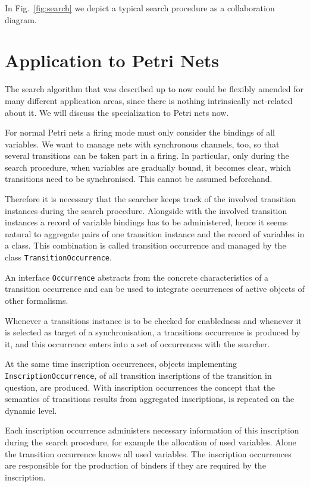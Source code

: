 
In Fig.~\ref{fig:search} we depict a typical search procedure as a 
collaboration diagram.


\section{Application to Petri Nets}
\label{sec:occrea}

The search algorithm that was described up to now could be flexibly
amended for many different application areas, since there is nothing
intrinsically net-related about it. We will discuss
the specialization to Petri nets now.

For normal Petri nets a firing mode must only consider the 
bindings of all variables. We want to manage nets with synchronous 
channels, too, so that several transitions can be taken part in a 
firing. In particular, only during the search procedure, when 
variables are gradually bound, it becomes 
clear, which transitions need to be synchronised.
This cannot be assumed beforehand.

Therefore it is necessary that the searcher keeps track 
of the involved transition instances during the search procedure. 
Alongside with the involved transition instances a record of variable 
bindings has to be administered, hence it seems natural to 
aggregate pairs of one transition instance and the record of
variables in a class. This combination is called transition 
occurrence and managed by the class \texttt{TransitionOccurrence}. 

An interface \texttt{Occurrence} abstracts from the concrete 
characteristics of a transition occurrence and can be used to integrate 
occurrences of active objects of other formalisms. 

Whenever a transitions instance is to be checked for enabledness and
whenever it is selected as target of a synchronisation, 
a transitions occurrence is produced by it, and this occurrence enters 
into a set of occurrences with the searcher. 

At the same time inscription occurrences, objects implementing
\texttt{InscriptionOccurrence}, of all transition inscriptions 
of the transition in question, are produced. With inscription occurrences 
the concept that the semantics of transitions results from aggregated 
inscriptions, is repeated on the dynamic level. 

Each inscription occurrence administers necessary information of 
this inscription during the search procedure, for example the 
allocation of used variables. Alone the transition occurrence knows 
all used variables. The inscription occurrences are responsible for 
the production of binders if they are required by the inscription. 

